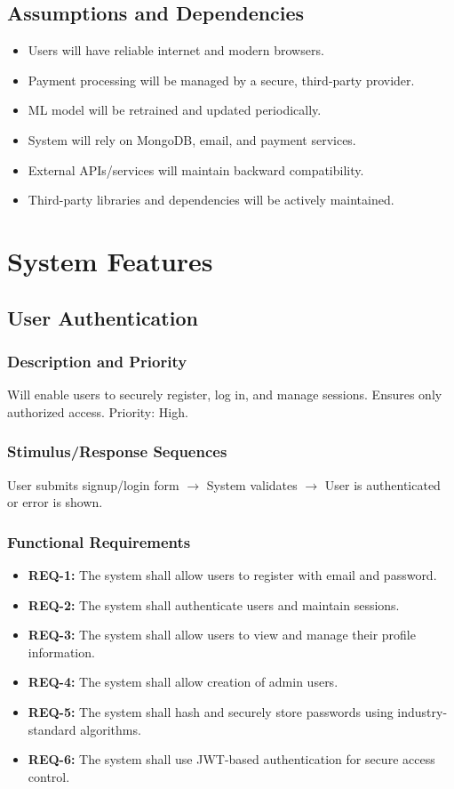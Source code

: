 \documentclass[11pt,a4paper]{article}
\begin{document}
\subsection{Assumptions and Dependencies}
\begin{itemize}
    \item Users will have reliable internet and modern browsers.
    \item Payment processing will be managed by a secure, third-party provider.
    \item ML model will be retrained and updated periodically.
    \item System will rely on MongoDB, email, and payment services.
    \item External APIs/services will maintain backward compatibility.
    \item Third-party libraries and dependencies will be actively maintained.
\end{itemize}

\section{System Features}

\subsection{User Authentication}
\subsubsection{Description and Priority}
Will enable users to securely register, log in, and manage sessions. Ensures only authorized access. Priority: High.
\subsubsection{Stimulus/Response Sequences}
User submits signup/login form $\rightarrow$ System validates $\rightarrow$ User is authenticated or error is shown.
\subsubsection{Functional Requirements}
\begin{itemize}
    \item \textbf{REQ-1:} The system shall allow users to register with email and password.
    \item \textbf{REQ-2:} The system shall authenticate users and maintain sessions.
    \item \textbf{REQ-3:} The system shall allow users to view and manage their profile information.
    \item \textbf{REQ-4:} The system shall allow creation of admin users.
    \item \textbf{REQ-5:} The system shall hash and securely store passwords using industry-standard algorithms.
    \item \textbf{REQ-6:} The system shall use JWT-based authentication for secure access control.
\end{itemize}
\end{document}
